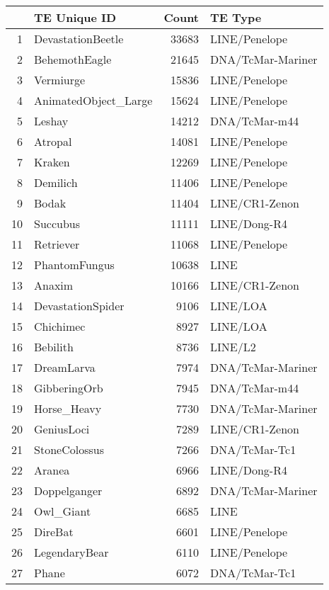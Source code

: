 \begin{table}[ht]
\centering
\begin{tabular}{rlrl}
  \hline
 & TE Unique ID & Count & TE Type \\ 
  \hline
1 & DevastationBeetle & 33683 & LINE/Penelope  \\ 
  2 & BehemothEagle & 21645 & DNA/TcMar-Mariner  \\ 
  3 & Vermiurge & 15836 & LINE/Penelope  \\ 
  4 & AnimatedObject\_Large & 15624 & LINE/Penelope  \\ 
  5 & Leshay & 14212 & DNA/TcMar-m44  \\ 
  6 & Atropal & 14081 & LINE/Penelope  \\ 
  7 & Kraken & 12269 & LINE/Penelope  \\ 
  8 & Demilich & 11406 & LINE/Penelope  \\ 
  9 & Bodak & 11404 & LINE/CR1-Zenon  \\ 
  10 & Succubus & 11111 & LINE/Dong-R4  \\ 
  11 & Retriever & 11068 & LINE/Penelope  \\ 
  12 & PhantomFungus & 10638 & LINE  \\ 
  13 & Anaxim & 10166 & LINE/CR1-Zenon  \\ 
  14 & DevastationSpider & 9106 & LINE/LOA  \\ 
  15 & Chichimec & 8927 & LINE/LOA  \\ 
  16 & Bebilith & 8736 & LINE/L2  \\ 
  17 & DreamLarva & 7974 & DNA/TcMar-Mariner  \\ 
  18 & GibberingOrb & 7945 & DNA/TcMar-m44  \\ 
  19 & Horse\_Heavy & 7730 & DNA/TcMar-Mariner  \\ 
  20 & GeniusLoci & 7289 & LINE/CR1-Zenon  \\ 
  21 & StoneColossus & 7266 & DNA/TcMar-Tc1  \\ 
  22 & Aranea & 6966 & LINE/Dong-R4  \\ 
  23 & Doppelganger & 6892 & DNA/TcMar-Mariner  \\ 
  24 & Owl\_Giant & 6685 & LINE  \\ 
  25 & DireBat & 6601 & LINE/Penelope  \\ 
  26 & LegendaryBear & 6110 & LINE/Penelope  \\ 
  27 & Phane & 6072 & DNA/TcMar-Tc1  \\ 

\end{tabular}
\end{table}
